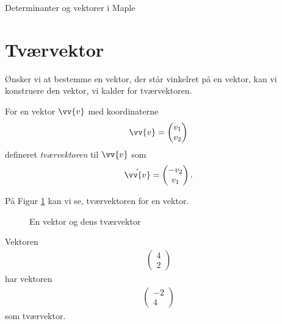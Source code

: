 \begin{center}
	\Huge
	Determinanter og vektorer i Maple
\end{center}


\section*{Tværvektor}

Ønsker vi at bestemme en vektor, der står vinkelret på en vektor, kan vi konstruere den vektor, vi kalder for tværvektoren.

\begin{defn}[Tværvektor]
	For en vektor $\vv{v}$ med koordinaterne
	\begin{align*}
		\vv{v} = 
		\begin{pmatrix}
			v_1 \\ v_2
		\end{pmatrix}
	\end{align*}
	defineret \textit{tværvektoren} til $\vv{v}$ som
	\begin{align*}
		\hat{\vv{v}} = 
		\begin{pmatrix}
			-v_2 \\ v_1
		\end{pmatrix}.
	\end{align*}
\end{defn}	

På Figur \ref{fig:tværvektor} kan vi se, tværvektoren for en vektor.

\begin{figure}[H]
	\centering
	\caption{En vektor og dens tværvektor}
	\label{fig:tværvektor}
\end{figure}

\begin{exa}
	Vektoren
	\begin{align*}
		\begin{pmatrix}
			4 \\ 2
		\end{pmatrix}
	\end{align*}
	har vektoren 
	\begin{align*}
		\begin{pmatrix}
			-2 \\ 4
		\end{pmatrix}
	\end{align*}
	som tværvektor. 
\end{exa}

